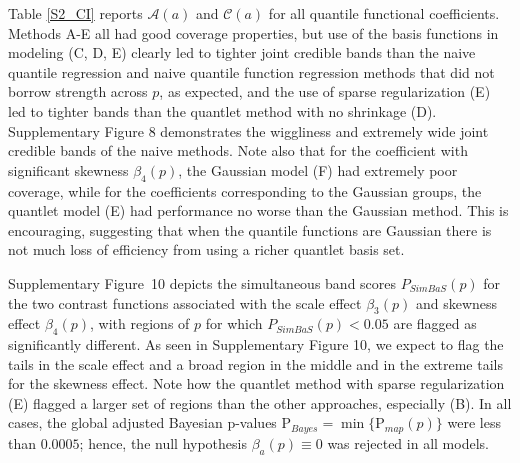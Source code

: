 \documentclass[11pt]{article}
\begin{document}
Table \ref{S2_CI} reports $\mathcal{A}(a)$ and  $\mathcal{C}(a)$ for all quantile functional coefficients.  Methods A-E all had good coverage properties, but use of the basis
functions in modeling (C, D, E) clearly led to tighter joint credible bands than the naive quantile regression and naive quantile function regression methods that did not borrow strength across $p$, as expected, and the use of sparse regularization (E) led to tighter bands than the quantlet method with no shrinkage (D).  Supplementary Figure 8 demonstrates the wiggliness and extremely wide joint credible bands of the naive methods.
Note also that for the coefficient with significant skewness $\beta_4(p)$, the Gaussian model (F) had extremely poor coverage, while for the coefficients corresponding to the Gaussian groups, the quantlet model (E) had performance no worse than the Gaussian method.   This is encouraging, suggesting that when the quantile functions are Gaussian there is not much loss of efficiency from using a richer quantlet basis set.  

Supplementary Figure~10 %
depicts the simultaneous band scores $P_{SimBaS}(p)$ for the two contrast functions associated with the scale effect $\beta_3(p)$ and skewness effect
$\beta_4(p)$, with regions of $p$ for which $P_{SimBaS}(p)<0.05$ are flagged as significantly different.  As seen in  Supplementary Figure 10, %
we expect to flag the tails in the scale effect and a broad region in the middle and in the extreme tails for the skewness effect.  Note how the quantlet method with sparse regularization (E) flagged a larger set of regions than the other approaches, especially (B).  In all cases, the global adjusted Bayesian p-values $\text{P}_{Bayes}=\min{\{\text{P}_{map}(p)\}}$ were less than $0.0005$; hence, 
the null hypothesis  $\beta_a(p)\equiv 0$ was rejected in all models.
\end{document}
